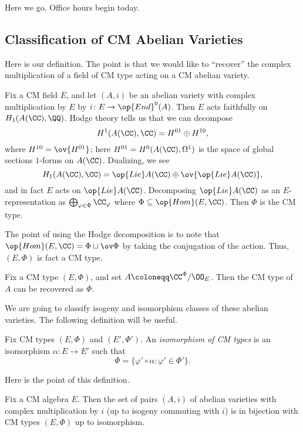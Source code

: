 \documentclass[../notes.tex]{subfiles}
\begin{document}
Here we go. Office hours begin today.

\subsection{Classification of CM Abelian Varieties}
Here is our definition. The point is that we would like to ``recover'' the complex multiplication of a field of CM type acting on a CM abelian variety.
\begin{definition}[CM type]
	Fix a CM field $E$, and let $(A,i)$ be an abelian variety with complex multiplication by $E$ by $i\colon E\to\op{End}^0(A)$. Then $E$ acts faithfully on $H_1(A(\CC),\QQ)$. Hodge theory tells us that we can decompose
	\[H^1(A(\CC),\CC)=H^{01}\oplus H^{10},\]
	where $H^{10}=\ov{H^{01}}$; here $H^{01}=H^0(A(\CC),\Omega^1)$ is the space of global sections $1$-forms on $A(\CC)$. Dualizing, we see
	\[H_1(A(\CC),\CC)=\op{Lie}A(\CC)\oplus\ov{\op{Lie}A(\CC)},\]
	and in fact $E$ acts on $\op{Lie}A(\CC)$. Decomposing $\op{Lie}A(\CC)$ as an $E$-representation as $\bigoplus_{\varphi\in\Phi}\CC_\varphi$ where $\Phi\subseteq\op{Hom}(E,\CC)$. Then $\Phi$ is the CM type.
\end{definition}
\begin{remark}
	The point of using the Hodge decomposition is to note that $\op{Hom}(E,\CC)=\Phi\sqcup\ov\Phi$ by taking the conjugation of the action. Thus, $(E,\Phi)$ is fact a CM type.
\end{remark}
\begin{example}
	Fix a CM type $(E,\Phi)$, and set $A\coloneqq\CC^\Phi/\OO_E$. Then the CM type of $A$ can be recovered as $\Phi$.
\end{example}
We are going to classify isogeny and isomorphism classes of these abelian varieties. The following definition will be useful.
\begin{definition}
	Fix CM types $(E,\Phi)$ and $(E',\Phi')$. An \textit{isomorphism of CM types} is an isomorphism $\alpha\colon E\to E'$ such that
	\[\Phi=\{\varphi'\circ\alpha:\varphi'\in\Phi'\}.\]
\end{definition}
Here is the point of this definition.
\begin{proposition} \label{prop:classify-cm-ab-isog}
	Fix a CM algebra $E$. Then the set of pairs $(A,i)$ of abelian varieties with complex multiplication by $i$ (up to isogeny commuting with $i$) is in bijection with CM types $(E,\Phi)$ up to isomorphism.
\end{proposition}
\end{document}
